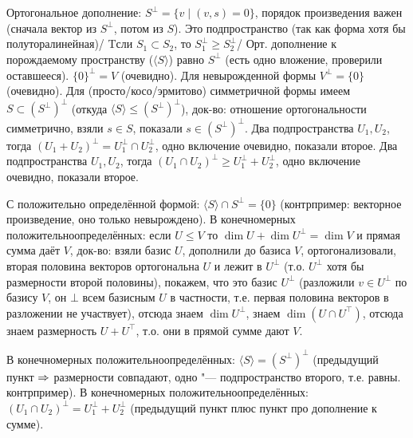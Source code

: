 \section{} %
Ортогональное дополнение: $S^\bot = \{ v \mid (v, s) = 0 \}$, порядок произведения важен (сначала вектор из $S^\bot$, потом из $S$).
Это подпространство (так как форма хотя бы полуторалинейная)/
Tсли $S_1 \subset S_2$, то $S_1^\bot \ge S_2^\bot$/
Орт. дополнение к порождаемому пространству ($\langle S \rangle$) равно $S^\bot$ (есть одно вложение, проверили оставшееся).
$\{0\}^\bot=V$ (очевидно).
Для невырожденной формы $V^\bot = \{0\}$ (очевидно).
Для (просто/косо/эрмитово) симметричной формы имеем $S \subset (S^\bot)^\bot$ (откуда $\langle S \rangle \le (S^\bot)^\bot$),
док-во: отношение ортогональности симметрично, взяли $s \in S$, показали $s \in (S^\bot)^\bot$.
Два подпространства $U_1, U_2$, тогда $(U_1+U_2)^\bot = U_1^\bot \cap U_2^\bot$, одно включение очевидно, показали второе.
Два подпространства $U_1, U_2$, тогда $(U_1\cap U_2)^\bot \ge U_1^\bot + U_2^\bot$, одно включение очевидно, показали второе.

С положительно определённой формой: $\langle S \rangle \cap S^\bot = \{0\}$ (контрпример: векторное произведение, оно только невырождено).
В конечномерных положительноопределённых: если $U \le V$ то $\dim U + \dim U^\bot = \dim V$ и прямая сумма даёт $V$,
док-во: взяли базис $U$, дополнили до базиса $V$, ортогонализовали, вторая половина векторов ортогональна $U$ и лежит в $U^\bot$
(т.о. $U^\bot$ хотя бы размерности второй половины), покажем, что это базис $U^\bot$ (разложили $v\in U^\bot$ по базису $V$, он $\bot$ всем базисным
$U$ в частности, т.е. первая половина векторов в разложении не участвует), отсюда знаем $\dim U^\bot$, знаем $\dim (U\cap U^\top)$, отсюда
знаем размерность $U+U^\top$, т.о. они в прямой сумме дают $V$.

В конечномерных положительноопределённых: $\langle S \rangle = (S^\bot)^\bot$
(предыдущий пункт $\Rightarrow$ размерности совпадают, одно "--- подпространство второго, т.е. равны. \TODO контрпример).
В конечномерных положительноопределённых: $(U_1\cap U_2)^\bot = U_1^\bot + U_2^\bot$ (предыдущий пункт плюс пункт про дополнение к сумме).

\section{} %


\section{} %


\section{} %


\section{} %


